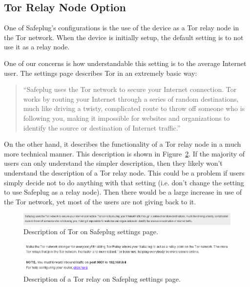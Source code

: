\documentclass[conference]{IEEEtran}
\begin{document}
\subsection{Tor Relay Node Option}
One of Safeplug's configurations is the use of the device as a Tor relay node in the Tor network.  When the device is initially setup, the default setting is to not use it as a relay node.  

One of our concerns is how understandable this setting is to the average Internet user.  The settings page describes Tor in an extremely basic way:

\begin{quotation}
``Safeplug uses the Tor network to secure your Internet connection.  Tor works by routing your Internet through a series of random destinations, much like driving a twisty, complicated route to throw off someone who is following you, making it impossible for websites and organizations to identify the source or destination of Internet traffic.'' \cite{safeplug}
\end{quotation}

On the other hand, it describes the functionality of a Tor relay node in a much more technical manner.  This description is shown in Figure~\ref{fig:relaydesc}.  If the majority of users can only understand the simpler description, then they likely won't understand the description of a Tor relay node.  This could be a problem if users simply decide not to do anything with that setting (i.e. don't change the setting to use Safeplug as a relay node).  Then there would be a large increase in use of the Tor network, yet most of the users are not giving back to it.

\begin{figure}
\begin{center}
\includegraphics[width=\textwidth]{funnydesc.png}
\caption{Description of Tor on Safeplug settings page.}
\label{fig:funnydesc}
\end{center}
\end{figure}

\begin{figure}[th]
\begin{center}
\includegraphics[width=\textwidth]{relaydesc.png}
\caption{Description of a Tor relay on Safeplug settings page.}
\label{fig:relaydesc}
\end{center}
\end{figure}
\end{document}
